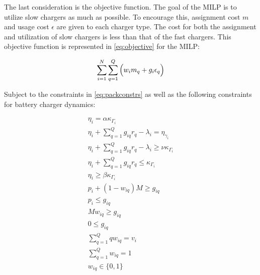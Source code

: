 \documentclass[letterpaper, 10pt, conference]{IEEEtran}
\begin{document}
The last consideration is the objective function. The goal of the MILP is to utilize slow chargers as much as possible. To encourage this, assignment cost \(m\) and usage cost \(\epsilon\) are given to each charger type. The cost for both the assignment and utilization of slow chargers is less than that of the fast chargers. This objective function is represented in \eqref{eq:objective} for the MILP:

\begin{equation}
\label{eq:objective}
    \sum_{i=1}^N \sum_{q=1}^Q \Big( w_i m_q + g_i \epsilon_q \Big) \\
\end{equation}

\noindent
Subject to the constraints in \eqref{eq:packconstrs} as well as the following constraints for battery charger dynamics:

\begin{subequations}
\label{eq:dynconstrs}
\begin{align}
    \eta_i = \alpha \kappa_{\Gamma_i}                                         \label{subeq:init_charge}  \\
    \eta_i + \sum_{q=1}^Q g_{iq} r_q - \lambda_i = \eta_{\gamma_i}            \label{subeq:next_charge}  \\
    \eta_i + \sum_{q=1}^Q g_{iq} r_q - \lambda_i \geq \nu \kappa_{\Gamma_i}   \label{subeq:min_charge}   \\
    \eta_i + \sum_{q=1}^Q g_{iq} r_q \leq \kappa_{\Gamma_i}                   \label{subeq:max_charge}   \\
    \eta_i \geq \beta \kappa_{\Gamma_i}                                       \label{subeq:final_charge} \\
    p_i + (1 - w_{iq})M \geq g_{iq}                                           \label{subeq:gpgret}       \\
    p_i \leq g_{iq}                                                           \label{subeq:gples}        \\
    Mw_{iq} \geq g_{iq}                                                       \label{subeq:gwgret}       \\
    0 \leq g_{iq}                                                             \label{subeq:gwles}        \\
    \sum_{q=1}^Q qw_{iq} = v_i                                                \label{subeq:wmax}         \\
    \sum_{q=1}^Q w_{iq} = 1                                                   \label{subeq:wone}         \\
    w_{iq} \in \{0,1\}                                                        \label{subeq:wspace}
\end{align}
\end{subequations}
\end{document}
